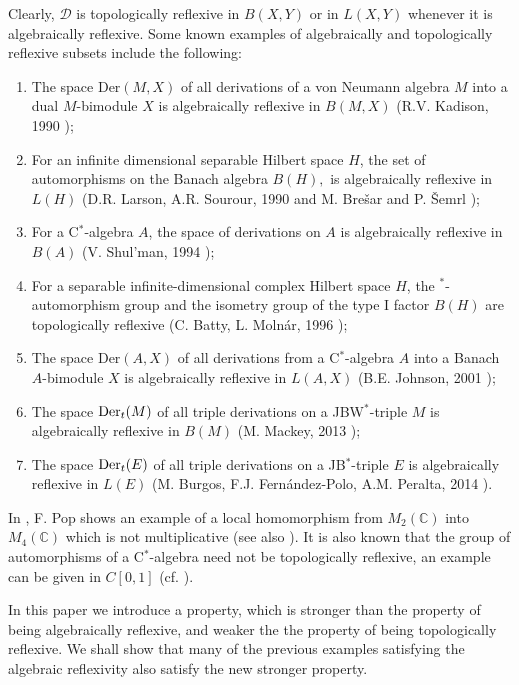 \documentclass[11pt]{amsart}
\begin{document}
Clearly, $\mathcal{D}$ is topologically reflexive in $B(X,Y)$ or in $L(X,Y)$ whenever it is algebraically reflexive. Some known examples of algebraically and topologically reflexive subsets include the following:\begin{enumerate}[$\checkmark$]
\item The space Der$(M,X)$ of all  derivations of a von Neumann algebra $M$ into a dual $M$-bimodule $X$ is algebraically reflexive in $B(M,X)$ (R.V. Kadison, 1990 \cite{Kad90});
\item For an infinite dimensional separable Hilbert space $H$, the set of automorphisms on the Banach algebra $B(H),$ is algebraically reflexive in $L(H)$ (D.R. Larson, A.R. Sourour, 1990 \cite{LarSou} and M. Bre\v{s}ar and P. \v{S}emrl  \cite[Theorem 2]{BreSemrl95});
\item For a C$^*$-algebra $A$, the space of derivations on $A$ is algebraically reflexive in $B(A)$ (V. Shul'man, 1994 \cite{Shu});
\item For a separable infinite-dimensional complex Hilbert space $H$, the $^*$-automorphism group and the isometry group of the type I factor $B(H)$ are topologically reflexive (C. Batty, L. Moln\'{a}r, 1996 \cite{BattMol});
\item The space Der$(A,X)$ of all  derivations from a C$^*$-algebra $A$ into a Banach $A$-bimodule $X$ is algebraically reflexive in $L(A,X)$ (B.E. Johnson, 2001 \cite{John01});
\item The space $\hbox{Der}_{t} (M)$ of all triple derivations on a JBW$^*$-triple $M$ is algebraically reflexive in $B(M)$ (M. Mackey, 2013 \cite{Mack});
\item The space $\hbox{Der}_{t} (E)$ of all triple derivations on a JB$^*$-triple $E$ is algebraically reflexive in $L(E)$ (M. Burgos, F.J. Fernández-Polo, A.M. Peralta, 2014 \cite{BurFerPe2014}).
\end{enumerate}

In \cite[\S 2]{Pop}, F. Pop shows an example of a local homomorphism from $M_2 (\mathbb{C})$ into $M_4 (\mathbb{C})$ which is not multiplicative (see also \cite[Example 3.13]{Pe2014}). It is also known that the group of automorphisms of a C$^*$-algebra need not be topologically reflexive, an example can be given in $C[0,1]$ (cf. \cite[page 415 and Theorem 5]{BattMol}).\smallskip

In this paper we introduce a property, which is stronger than the property of being algebraically reflexive, and weaker the the property of being topologically reflexive. We shall show that many of the previous examples satisfying the algebraic reflexivity also satisfy the new stronger property.
\end{document}
